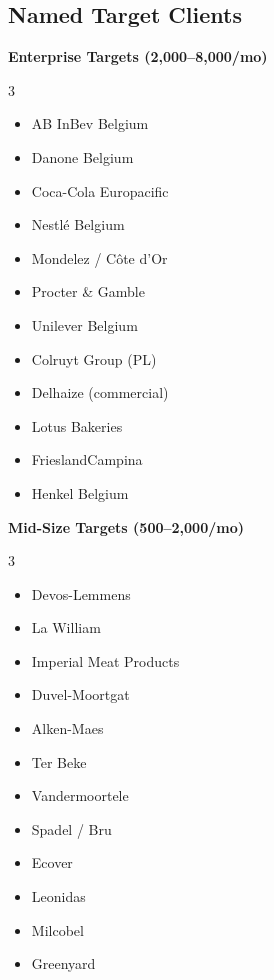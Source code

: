 \documentclass[11pt,a4paper]{article}
\begin{document}
\subsection{Named Target Clients}

\begin{productbox}
\textbf{\color{miloprimary}Enterprise Targets (\texteuro{}2,000--8,000/mo)}\\[4pt]
\begin{multicols}{3}
\begin{itemize}[leftmargin=1em, itemsep=1pt, font=\small]
  \item AB InBev Belgium
  \item Danone Belgium
  \item Coca-Cola Europacific
  \item Nestl\'{e} Belgium
  \item Mondelez / C\^{o}te d'Or
  \item Procter \& Gamble
  \item Unilever Belgium
  \item Colruyt Group (PL)
  \item Delhaize (commercial)
  \item Lotus Bakeries
  \item FrieslandCampina
  \item Henkel Belgium
\end{itemize}
\end{multicols}
\end{productbox}

\begin{productbox}
\textbf{\color{miloprimary}Mid-Size Targets (\texteuro{}500--2,000/mo)}\\[4pt]
\begin{multicols}{3}
\begin{itemize}[leftmargin=1em, itemsep=1pt, font=\small]
  \item Devos-Lemmens
  \item La William
  \item Imperial Meat Products
  \item Duvel-Moortgat
  \item Alken-Maes
  \item Ter Beke
  \item Vandermoortele
  \item Spadel / Bru
  \item Ecover
  \item Leonidas
  \item Milcobel
  \item Greenyard
\end{itemize}
\end{multicols}
\end{productbox}
\end{document}
